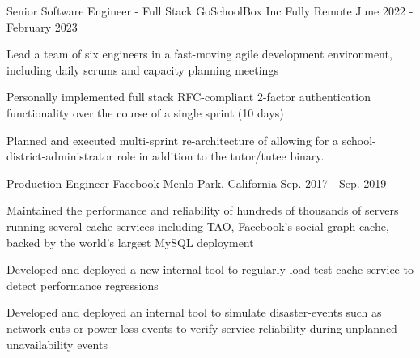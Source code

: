 \begin{cventries}
  \cventry
    {Senior Software Engineer - Full Stack}
    {\hspace{0.7em}GoSchoolBox Inc}
    {Fully Remote}
    {June 2022 - February 2023}
    {
      \begin{cvitems}
        \item {
          Lead a team of six engineers in a fast-moving agile development environment, 
          including daily scrums and capacity planning meetings
        }
        \item {
          Personally implemented full stack RFC-compliant 2-factor
          authentication functionality over the course of a single sprint (10 days)
        }
        \item {
          Planned and executed multi-sprint re-architecture of allowing for a
          school-district-administrator role in addition to the tutor/tutee binary.
        }
      \end{cvitems}
    }


  \cventry
    {Production Engineer} %
    {
      \hspace{0.7em}
      Facebook
    } %
    {Menlo Park, California} %
    {Sep. 2017 - Sep. 2019} %
    {
      \begin{cvitems} %
        \item {
          Maintained the performance and reliability of hundreds of thousands
          of servers running several cache services including TAO, Facebook's
          social graph cache, backed by the world's largest MySQL deployment
        }
        \item {
          Developed and deployed a new internal tool to regularly
          load-test cache service to detect performance regressions
        } 
        \item {
          Developed and deployed an internal tool to simulate disaster-events
          such as network cuts or power loss events to verify service
          reliability during unplanned unavailability events
        }
      \end{cvitems}
    }


\end{cventries}
